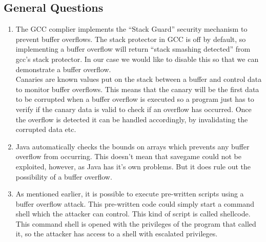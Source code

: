 \documentclass[9pt,a4paper]{article}
\begin{document}
\subsection{General Questions}
\begin{enumerate}
\item The GCC complier implements the ``Stack Guard'' security mechanism to prevent buffer overflows. The stack protector in GCC is off by default, so implementing a buffer overflow will return ``stack smashing detected'' from gcc's stack protector. In our case we would like to disable this so that we can demonstrate a buffer overflow.\\
Canaries are known values put on the stack between a buffer and control data to monitor buffer overflows. This means that the canary will be the first data to be corrupted when a buffer overflow is executed so a program just has to verify if the canary data is valid to check if an overflow has occurred. Once the overflow is detected it can be handled accordingly, by invalidating the corrupted data etc.
\item Java automatically checks the bounds on arrays which prevents any buffer overflow from occurring. This doesn't mean that savegame could not be exploited, however, as Java has it's own problems. But it does rule out the possibility of a buffer overflow.
\item As mentioned earlier, it is possible to execute pre-written scripts using a buffer overflow attack. This pre-written code could simply start a command shell which the attacker can control. This kind of script is called shellcode. This command shell is opened with the privileges of the program that called it, so the attacker has access to a shell with escalated privileges.
\end{enumerate}
\end{document}
